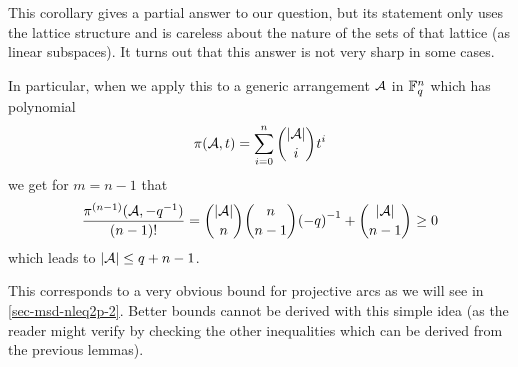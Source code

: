 This corollary gives a partial answer to our question, but its statement only uses the lattice structure and is careless about the nature of the sets of that lattice (as linear subspaces). It turns out that this answer is not very sharp in some cases.

In particular, when we apply this to a generic arrangement $\mathcal{A}$ in $\mathbb{F}_{q}^n$ which has  polynomial
$$
\pi(\cA,t)=\sum_{i=0}^{n}{\binom{\card{\cA}}{i} t^i}
$$
we get for $m=n-1$ that
$$
\frac{\pi^{(n-1)}(\cA,-q^{-1})}{(n-1)!}=\binom{\card\cA}{n}\binom{n}{n-1}{(-q)}^{-1}+\binom{\card\cA}{n-1}\geq 0
$$
which leads to $\left\vert{\mathcal{A}}\right\vert\leq q+n-1$.

This corresponds to a very obvious bound for projective arcs as we will see in \autoref{sec-msd-nleq2p-2}. Better bounds cannot be derived with this simple idea (as the reader might verify by checking the other inequalities which can be derived from the previous lemmas).